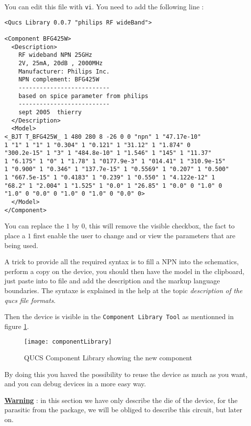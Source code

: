 You can edit this file with \texttt{vi}. You need to add the following line :
\begin{verbatim}
<Qucs Library 0.0.7 "philips RF wideBand">

<Component BFG425W>
  <Description>
    RF wideband NPN 25GHz 
    2V, 25mA, 20dB , 2000MHz
    Manufacturer: Philips Inc.
    NPN complement: BFG425W
    --------------------------
    based on spice parameter from philips
    --------------------------
    sept 2005  thierry
  </Description>
  <Model>
<_BJT T_BFG425W_ 1 480 280 8 -26 0 0 "npn" 1 "47.17e-10" 
1 "1" 1 "1" 1 "0.304" 1 "0.121" 1 "31.12" 1 "1.874" 0 
"300.2e-15" 1 "3" 1 "484.8e-10" 1 "1.546" 1 "145" 1 "11.37"
1 "6.175" 1 "0" 1 "1.78" 1 "0177.9e-3" 1 "014.41" 1 "310.9e-15"
1 "0.900" 1 "0.346" 1 "137.7e-15" 1 "0.5569" 1 "0.207" 1 "0.500"
1 "667.5e-15" 1 "0.4183" 1 "0.239" 1 "0.550" 1 "4.122e-12" 1
"68.2" 1 "2.004" 1 "1.525" 1 "0.0" 1 "26.85" 1 "0.0" 0 "1.0" 0 
"1.0" 0 "0.0" 0 "1.0" 0 "1.0" 0 "0.0" 0>
  </Model>
</Component>
\end{verbatim}

You can replace the $1$ by $0$, this will remove the visible checkbox, the fact to place a $1$ first enable the user to change and or view the parameters that are being used.

A trick to provide all the required syntax is to fill a NPN into the schematics, perform a copy on the device, you should then have the model in the clipboard, just paste into to file and add the description and the markup language boundaries. The syntaxe is explained in the help at the topic \textit{description of the qucs file formats}.


Then the device is visible in the \texttt{Component Library Tool} as mentionned in figure \ref{design:pa:componentTool}.

\begin{figure}[htbp]
\begin{center}
	\texttt{[image: componentLibrary]}
	\caption{QUCS Component Library showing the new component}
	\label{design:pa:componentTool}
\end{center}
\end{figure}


By doing this you haved the possibility to reuse the device as much as you want, and you can debug devices in a more easy way.

\underline{\textbf{Warning}} : in this section we have only describe the die of the device, for the parasitic from the package, we will be obliged to describe this circuit, but later on.

